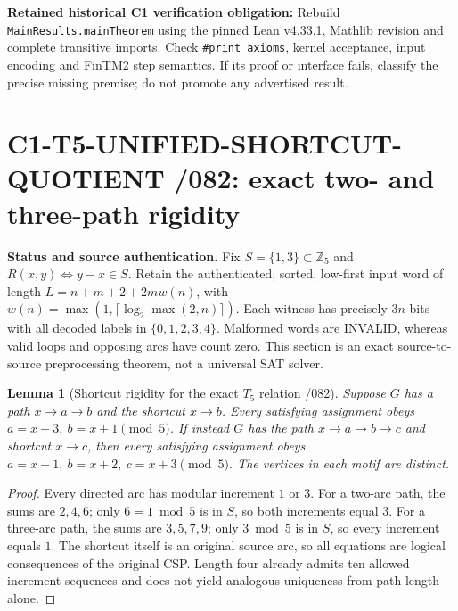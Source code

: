 \documentclass[11pt]{article}
\newtheorem{lemma}{Lemma}
\begin{document}
\textbf{Retained historical C1 verification obligation:} Rebuild
\texttt{MainResults.mainTheorem} using the pinned Lean v4.33.1,
Mathlib revision and complete transitive imports. Check \texttt{\#print axioms},
kernel acceptance, input encoding and FinTM2 step semantics.
If its proof or interface fails, classify the precise missing premise;
do not promote any advertised result.


\section{C1-T5-UNIFIED-SHORTCUT-QUOTIENT /082: exact two- and three-path rigidity}

\noindent\textbf{Status and source authentication.}
Fix $S=\{1,3\}\subset\mathbb Z_5$ and $R(x,y)\iff y-x\in S$.
Retain the authenticated, sorted, low-first input word of length
$L=n+m+2+2mw(n)$, with $w(n)=\max(1,\lceil\log_2\max(2,n)\rceil)$.
Each witness has precisely $3n$ bits with all decoded labels in
$\{0,1,2,3,4\}$. Malformed words are INVALID, whereas valid loops
and opposing arcs have count zero. This section is an exact
source-to-source preprocessing theorem, not a universal SAT solver.

\begin{lemma}[Shortcut rigidity for the exact $T_5$ relation /082]
Suppose $G$ has a path $x\to a\to b$ and the shortcut $x\to b$.
Every satisfying assignment obeys
$a=x+3,\ b=x+1\pmod5$.
If instead $G$ has the path
$x\to a\to b\to c$ and shortcut $x\to c$, then every satisfying
assignment obeys
$a=x+1,\ b=x+2,\ c=x+3\pmod5$.
The vertices in each motif are distinct.
\end{lemma}
\begin{proof}
Every directed arc has modular increment $1$ or $3$.
For a two-arc path, the sums are $2,4,6$; only $6=1\bmod5$
is in $S$, so both increments equal $3$.
For a three-arc path, the sums are $3,5,7,9$; only $3\bmod5$
is in $S$, so every increment equals $1$.
The shortcut itself is an original source arc, so all equations
are logical consequences of the original CSP.
Length four already admits ten allowed increment sequences and
does not yield analogous uniqueness from path length alone.
\end{proof}
\end{document}
